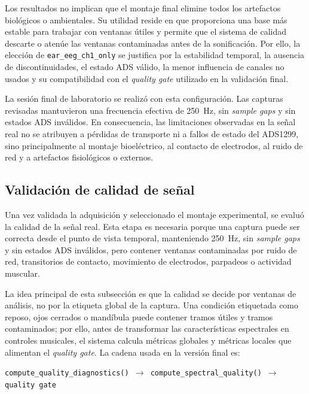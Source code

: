 \documentclass[../main.tex]{subfiles}
\begin{document}
Los resultados no implican que el montaje final elimine todos los artefactos biológicos o ambientales. Su utilidad reside en que proporciona una base más estable para trabajar con ventanas útiles y permite que el sistema de calidad descarte o atenúe las ventanas contaminadas antes de la sonificación. Por ello, la elección de \texttt{ear\_eeg\_ch1\_only} se justifica por la estabilidad temporal, la ausencia de discontinuidades, el estado ADS válido, la menor influencia de canales no usados y su compatibilidad con el \textit{quality gate} utilizado en la validación final.

La sesión final de laboratorio se realizó con esta configuración. Las capturas revisadas mantuvieron una frecuencia efectiva de \SI{250}{\hertz}, sin \textit{sample gaps} y sin estados ADS inválidos. En consecuencia, las limitaciones observadas en la señal real no se atribuyen a pérdidas de transporte ni a fallos de estado del ADS1299, sino principalmente al montaje bioeléctrico, al contacto de electrodos, al ruido de red y a artefactos fisiológicos o externos.

\subsection{Validación de calidad de señal}
\label{subsec:validacion_calidad_senal}

Una vez validada la adquisición y seleccionado el montaje experimental, se evaluó la calidad de la señal real. Esta etapa es necesaria porque una captura puede ser correcta desde el punto de vista temporal, manteniendo \SI{250}{\hertz}, sin \textit{sample gaps} y sin estados ADS inválidos, pero contener ventanas contaminadas por ruido de red, transitorios de contacto, movimiento de electrodos, parpadeos o actividad muscular.

La idea principal de esta subsección es que la calidad se decide por ventanas de análisis, no por la etiqueta global de la captura. Una condición etiquetada como reposo, ojos cerrados o mandíbula puede contener tramos útiles y tramos contaminados; por ello, antes de transformar las características espectrales en controles musicales, el sistema calcula métricas globales y métricas locales que alimentan el \textit{quality gate}. La cadena usada en la versión final es:

\begin{center}
\texttt{compute\_quality\_diagnostics() $\rightarrow$ compute\_spectral\_quality() $\rightarrow$ quality gate}
\end{center}
\end{document}
